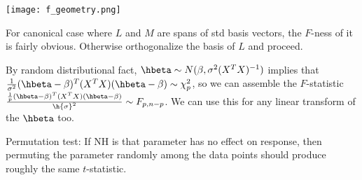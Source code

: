 \documentclass{article}
\begin{document}
\texttt{[image: f\_geometry.png]}

For canonical case where $L$ and $M$ are spans of std basis vectors, the $F$-ness of it is fairly obvious. Otherwise orthogonalize the basis of $L$ and proceed.

By random distributional fact, $\hbeta\sim N(\beta,\sigma^2(X^TX)^{-1})$ implies that $\frac{1}{\sigma^2}(\hbeta-\beta)^T(X^TX)(\hbeta-\beta)\sim\chi^2_p$, so we can assemble the $F$-statistic $\frac{\frac{1}{p}(\hbeta-\beta)^T(X^TX)(\hbeta-\beta)}{\h{\sigma}^2}\sim F_{p,n-p}$. We can use this for any linear transform of the $\hbeta$ too.

Permutation test: If NH is that parameter has no effect on response, then permuting the parameter randomly among the data points should produce roughly the same $t$-statistic. 
\end{document}

